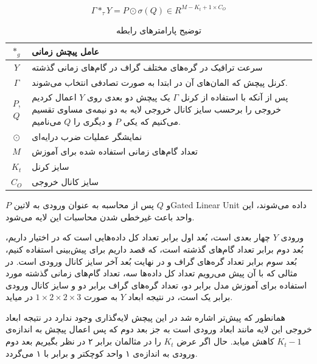 \documentclass{article}
\begin{document}
\begin{equation}
  \Gamma *_{\tau} Y = P \odot \sigma (Q) \in R^{M-K_{t}+1 \times C_{O}}
  \label{eq:time-conv}
\end{equation}

\begin{table}[h]
  \centering
  \caption{توضیح پارامترهای رابطه }
  \begin{tabular}{|c|p{}|}
    \hline
    $*_{g}$ & عامل پیچش زمانی \\
    \hline
    $Y$ & سرعت ترافیک در گره‌های مختلف گراف در گام‌های زمانی گذشته \\
    \hline
    $\Gamma$ & کرنل پیچش که المان‌های آن در ابتدا به صورت تصادفی انتخاب می‌شوند. \\
    \hline
    $P$, $Q$ & پس از آنکه با استفاده از کرنل $\Gamma$ یک پیچش دو بعدی روی $Y$ اعمال کردیم خروجی را برحسب سایز کانال خروجی لایه به دو نیمه‌ی مساوی تقسیم می‌کنیم که یکی $P$ و دیگری را $Q$ می‌نامیم. \\
    \hline
    $\odot$ & نمایشگر عملیات ضرب درایه‌ای \\
    \hline
    $M$ & تعداد گام‌های زمانی استفاده شده برای آموزش \\
    \hline
    $K_{t}$ & سایز کرنل \\
    \hline
    $C_{O}$ & سایز کانال خروجی \\
    \hline
  \end{tabular}
  \label{tbl:distance}
\end{table}

 $P$ و $Q$ پس از محاسبه به عنوان ورودی به ‌لاتین{Gated Linear Unit} داده می‌شوند، این واحد باعث غیرخطی شدن محاسبات این لایه می‌شود.

ورودی $Y$ چهار بعدی است، بُعد اول برابر تعداد کل داده‌هایی است که در اختیار داریم، بُعد دوم برابر
تعداد گام‌های گذشته است، که قصد داریم برای پیش‌بینی استفاده کنیم،
بُعد سوم برابر تعداد گره‌های گراف و در نهایت بُعد آخر سایز کانال ورودی است.
در مثالی که با آن پیش می‌رویم تعداد کل داده‌ها سه، تعداد گام‌های زمانی گذشته مورد استفاده برای آموزش مدل برابر دو،
تعداد گره‌های گراف برابر دو و سایز کانال ورودی برابر یک است، در نتیجه ابعاد $Y$ به صورت $ 1 \times 2 \times 2 \times 3 $ در میاید.

همانطور که پیش‌تر اشاره شد در این پیچش لایه‌گذاری وجود ندارد در نتیجه ابعاد خروجی این لایه مانند ابعاد ورودی است به جز بعد دوم
که پس اعمال پیچش به اندازه‌ی $K_{t}-1$ کاهش میابد. حال اگر عرض $K_{t}$ را در مثالمان برابر ۲ در نظر بگیریم
بعد دوم ورودی به اندازه‌ی ۱ واحد کوچکتر و برابر با ۱ می‌گردد.
\end{document}
